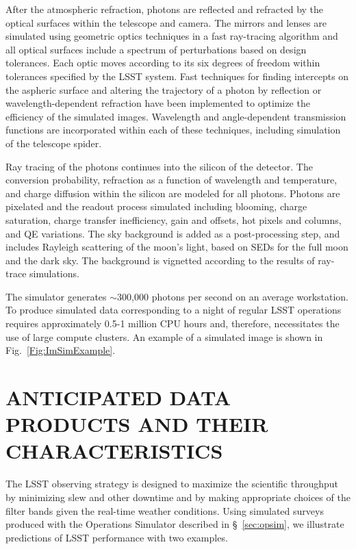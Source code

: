 \documentclass{emulateapj}
\begin{document}
{After the atmospheric refraction, photons are reflected and refracted
by the optical surfaces within the telescope and camera. The mirrors
and lenses are simulated using geometric optics techniques in a fast
ray-tracing algorithm and all optical surfaces include a spectrum of
perturbations based on design tolerances. Each optic moves according
to its six degrees of freedom within tolerances specified by the LSST
system. Fast techniques for finding intercepts on the aspheric surface
and altering the trajectory of a photon by reflection or
wavelength-dependent refraction have been implemented to optimize the
efficiency of the simulated images. Wavelength and angle-dependent
transmission functions are incorporated within each of these
techniques, including simulation of the telescope spider.

Ray tracing of the photons continues into the silicon of the
detector. The conversion probability, refraction as a function of
wavelength and temperature, and charge diffusion within the silicon
are modeled for all photons. Photons are pixelated and the readout
process simulated including blooming, charge saturation, charge
transfer inefficiency, gain and offsets, hot pixels and columns, and
QE variations. The sky background is added as a post-processing step,
and includes Rayleigh scattering of the moon's light, based on SEDs
for the full moon and the dark sky. The background is vignetted
according to the results of ray-trace simulations.

The simulator generates $\sim$300,000 photons per second on an average
workstation. To produce simulated data corresponding to a night of
regular LSST operations requires approximately 0.5-1 million CPU hours
and, therefore, necessitates the use of large compute clusters.  An
example of a simulated image is shown in Fig.~\ref{Fig:ImSimExample}.
}

\section{    ANTICIPATED DATA PRODUCTS AND THEIR CHARACTERISTICS    }
\label{Sec:dataprod}

The LSST observing strategy is designed to maximize the scientific
throughput by minimizing slew and other downtime and by making appropriate
choices of the filter bands given the real-time weather conditions.
Using simulated surveys produced with the Operations Simulator described in \S~\ref{sec:opsim}, 
we illustrate predictions of LSST performance with two examples. 
\end{document}
